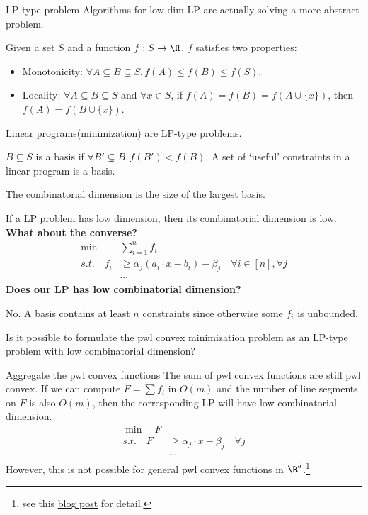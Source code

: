 \documentclass{beamer}
\begin{document}
\begin{frame}[allowframebreaks]{LP-type problem}
    Algorithms for low dim LP are actually solving a more abstract problem.
    \begin{definition}
        Given a set $S$ and a function $f:S\to \R$. $f$ satisfies two properties:%
        \begin{itemize}
            \item Monotonicity: $\forall A\subseteq B\subseteq S, f(A)\leq f(B)\leq f(S)$.
            \item Locality: $\forall A\subseteq B\subseteq S$ and $\forall x\in S$, if $f(A) = f(B) = f(A \cup \{x\})$, then $f(A) = f(B \cup \{x\})$.
        \end{itemize}
    \end{definition}
    Linear programs(minimization) are LP-type problems.

    $B\subseteq S$ is a basis if $\forall B'\subsetneq B, f(B')<f(B)$. A set of `useful' constraints in a linear program is a basis.

    The combinatorial dimension is the size of the largest basis.

    If a LP problem has low dimension, then its combinatorial dimension is low. \textbf{What about the converse?}
    \newpage
    \begin{align*}
        \min &\sum_{i=1}^n f_i\\
        s.t. \quad f_i&\geq \alpha_j(a_i\cdot x -b_i)-\beta_j \quad \forall i\in[n], \forall j\\
        &\cdots
    \end{align*}%
    \textbf{Does our LP has low combinatorial dimension?}
    
    No. A basis contains at least $n$ constraints since otherwise some $f_i$ is unbounded.

    \begin{problem}
        Is it possible to formulate the pwl convex minimization problem as an LP-type problem with low combinatorial dimension?
    \end{problem}
\end{frame}



\begin{frame}{Aggregate the pwl convex functions}
    The sum of pwl convex functions are still pwl convex. 
    \newline If we can compute $F=\sum f_i$ in $O(m)$ and the number of line segments on $F$ is also $O(m)$, then the corresponding LP will have low combinatorial dimension.
    \begin{align*}
        \min \quad F\\
        s.t. \quad F&\geq \alpha_j\cdot x -\beta_j \quad \forall j\\
        &\cdots
    \end{align*}
    However, this is not possible for general pwl convex functions in $\R^d$.\footnote{see this \href{https://talldoor.uk/posts/2024-09-16-piecewise-linear.html}{blog post} for detail.}
\end{frame}
\end{document}
